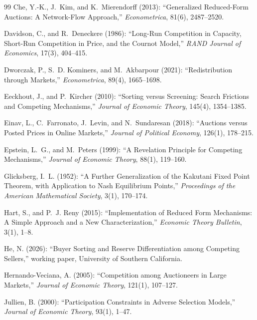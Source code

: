 \documentclass[12pt]{article}
\theoremstyle{mystyle}
\theoremstyle{mystyle2}
\newcommand{\1}{\mathbf{1}}
\begin{document}
\begin{thebibliography}{99}
 Che, Y.-K., J.~Kim, and K.~Mierendorff (2013): ``Generalized Reduced-Form Auctions: A Network-Flow Approach,'' \emph{Econometrica}, 81(6), 2487--2520.

 Davidson, C., and R.~Deneckere (1986): ``Long-Run Competition in Capacity, Short-Run Competition in Price, and the Cournot Model,'' \emph{RAND Journal of Economics}, 17(3), 404--415.

 Dworczak, P., S.~D. Kominers, and M.~Akbarpour (2021): ``Redistribution through Markets,'' \emph{Econometrica}, 89(4), 1665--1698.

 Eeckhout, J., and P.~Kircher (2010): ``Sorting versus Screening: Search Frictions and Competing Mechanisms,'' \emph{Journal of Economic Theory}, 145(4), 1354--1385.

 Einav, L., C.~Farronato, J.~Levin, and N.~Sundaresan (2018): ``Auctions versus Posted Prices in Online Markets,'' \emph{Journal of Political Economy}, 126(1), 178--215.

 Epstein, L.~G., and M.~Peters (1999): ``A Revelation Principle for Competing Mechanisms,'' \emph{Journal of Economic Theory}, 88(1), 119--160.

 Glicksberg, I.~L. (1952): ``A Further Generalization of the Kakutani Fixed Point Theorem, with Application to Nash Equilibrium Points,'' \emph{Proceedings of the American Mathematical Society}, 3(1), 170--174.

 Hart, S., and P.~J. Reny (2015): ``Implementation of Reduced Form Mechanisms: A Simple Approach and a New Characterization,'' \emph{Economic Theory Bulletin}, 3(1), 1--8.

 He, N. (2026): ``Buyer Sorting and Reserve Differentiation among Competing Sellers,'' working paper, University of Southern California.

 Hernando-Veciana, A. (2005): ``Competition among Auctioneers in Large Markets,'' \emph{Journal of Economic Theory}, 121(1), 107--127.

 Jullien, B. (2000): ``Participation Constraints in Adverse Selection Models,'' \emph{Journal of Economic Theory}, 93(1), 1--47.


\end{thebibliography}
\end{document}
